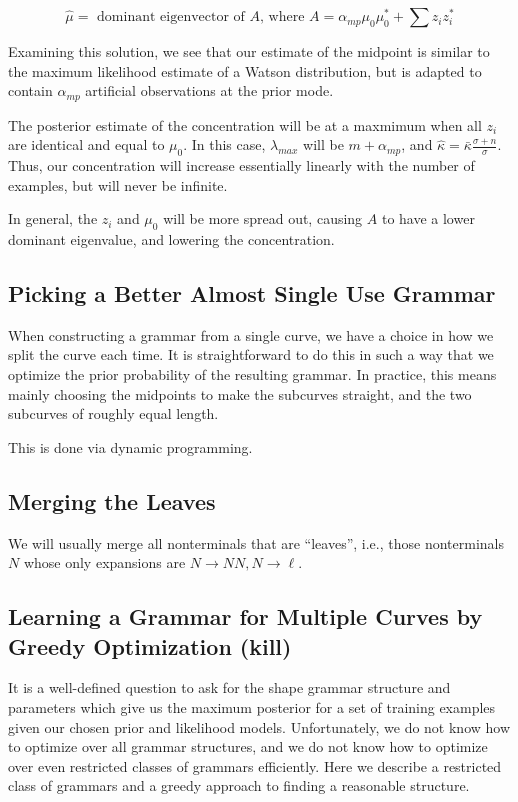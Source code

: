 $$
\widehat{\mu} = \mbox{ dominant eigenvector of }
A\mbox{, where } A = \alpha_{mp} \mu_0 \mu_0^* + \sum z_i z_i^*
$$

Examining this solution, we see that our estimate of the
midpoint is similar to the maximum likelihood estimate of
a Watson distribution, but is adapted to contain
$\alpha_{mp}$ artificial observations at the prior mode.

The posterior estimate of the concentration will be at
a maxmimum when all $z_i$ are identical and equal to 
$\mu_0$. In this case, $\lambda_{max}$ will be
$m + \alpha_{mp}$, and $\widehat{\kappa} = 
\bar{\kappa} \frac{\sigma+n}{\sigma}$. Thus, our concentration will
increase essentially linearly with the number of examples, but will never
be infinite.

In general, the $z_i$ and $\mu_0$ will be more spread out, causing $A$
to have a lower dominant eigenvalue, and lowering the concentration.

\subsection{Picking a Better Almost Single Use Grammar}

When constructing a grammar from a single curve, we have a choice in
how we split the curve each time. It is straightforward to do this in
such a way that we optimize the prior probability of the resulting
grammar. In practice, this means mainly choosing the midpoints to make
the subcurves straight, and the two subcurves of roughly equal length.

This is done via dynamic programming.

\subsection{Merging the Leaves}

We will usually merge all nonterminals that are ``leaves'', i.e.,
those nonterminals $N$ whose only expansions are $N\to NN, N\to \ell$.

\subsection{Learning a Grammar for Multiple Curves by Greedy Optimization (kill)}

It is a well-defined question to ask for the shape grammar structure
and parameters which give us the maximum posterior for a set of
training examples given our chosen prior and likelihood
models. Unfortunately, we do not know how to optimize over all grammar
structures, and we do not know how to optimize over even restricted
classes of grammars efficiently. Here we describe a restricted class
of grammars and a greedy approach to finding a reasonable structure.

